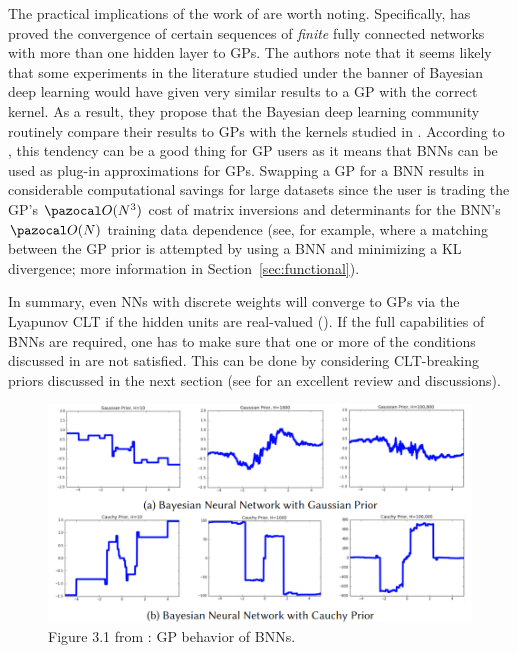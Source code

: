 The practical implications of the work of \textcite{matthews2018gaussian} are worth noting. 
Specifically, \textcite{matthews2018gaussian} has proved the convergence of certain sequences of \textit{finite} fully connected networks with more than one hidden layer to GPs.
The authors note that it seems likely that some experiments in the literature studied under the banner of Bayesian deep learning would have given very similar results to a GP with the correct kernel.
As a result, they propose that the Bayesian deep learning community routinely compare their results to GPs with the kernels studied in \textcite{matthews2018gaussian}. 
According to \textcite{nalisnick2018priors}, this tendency can be a good thing for GP users as it means that BNNs can be used as plug-in approximations for GPs.  
Swapping a GP for a BNN results in considerable computational savings for large datasets since the user is trading the GP’s $\cO(N^3)$ cost of matrix inversions and determinants for the BNN’s $\cO(N)$ training data dependence (see, for example, \cite{flam-shepherd2017mapping} where a matching between the GP prior is attempted by using a BNN and minimizing a KL divergence; more information in Section~\ref{sec:functional}).

In summary, even NNs with discrete weights will converge to GPs via the Lyapunov CLT if the hidden units are real-valued (\cite{matthews2018gaussian}).
If the full capabilities of BNNs are required, one has to make sure that one or more of the conditions discussed in \textcite{matthews2018gaussian} are not satisfied. 
This can be done by considering CLT-breaking priors discussed in the next section (see \cite{nalisnick2018priors} for an excellent review and discussions).

\begin{figure}
	\centering
	\includegraphics[width=1\linewidth]{./Figures/BNNs_with_priors.png}
	\caption{Figure 3.1 from \textcite{nalisnick2018priors}: GP behavior of BNNs.}
	\label{fig:BNNs_with_priors}
\end{figure} 

